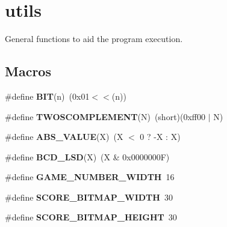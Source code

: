 \hypertarget{group__utils}{}\section{utils}
\label{group__utils}


General functions to aid the program execution.  


\subsection*{Macros}
\begin{DoxyCompactItemize}
\item 
\hypertarget{group__utils_ga3a8ea58898cb58fc96013383d39f482c}{}\label{group__utils_ga3a8ea58898cb58fc96013383d39f482c} 
\#define {\bfseries B\+IT}(n)~(0x01$<$$<$(n))
\item 
\hypertarget{group__utils_gaf950895e69e437a348ac1407bbd11ea4}{}\label{group__utils_gaf950895e69e437a348ac1407bbd11ea4} 
\#define {\bfseries T\+W\+O\+S\+C\+O\+M\+P\+L\+E\+M\+E\+NT}(N)~(short)(0xff00 $\vert$ N)
\item 
\hypertarget{group__utils_gad6ae1d369579339599c58da9cc4ce125}{}\label{group__utils_gad6ae1d369579339599c58da9cc4ce125} 
\#define {\bfseries A\+B\+S\+\_\+\+V\+A\+L\+UE}(X)~(X $<$ 0 ? -\/X \+: X)
\item 
\hypertarget{group__utils_ga8ff6975af6d61da16e8f92aded787994}{}\label{group__utils_ga8ff6975af6d61da16e8f92aded787994} 
\#define {\bfseries B\+C\+D\+\_\+\+L\+SD}(X)~(X \& 0x0000000\+F)
\item 
\hypertarget{group__utils_ga932d66ca42c8c9822ed8569075af97f1}{}\label{group__utils_ga932d66ca42c8c9822ed8569075af97f1} 
\#define {\bfseries G\+A\+M\+E\+\_\+\+N\+U\+M\+B\+E\+R\+\_\+\+W\+I\+D\+TH}~16
\item 
\hypertarget{group__utils_ga1099bf02d8acbb70410ad8b76918b201}{}\label{group__utils_ga1099bf02d8acbb70410ad8b76918b201} 
\#define {\bfseries S\+C\+O\+R\+E\+\_\+\+B\+I\+T\+M\+A\+P\+\_\+\+W\+I\+D\+TH}~30
\item 
\hypertarget{group__utils_ga9171053632f1f0bc4c6c71c15d93cb57}{}\label{group__utils_ga9171053632f1f0bc4c6c71c15d93cb57} 
\#define {\bfseries S\+C\+O\+R\+E\+\_\+\+B\+I\+T\+M\+A\+P\+\_\+\+H\+E\+I\+G\+HT}~30
\end{DoxyCompactItemize}
